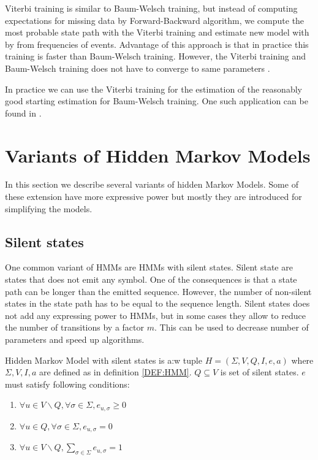 Viterbi training is similar to Baum-Welsch training, but instead of computing
expectations for missing data by Forward-Backward algorithm, we compute the most
probable state path with the Viterbi training and estimate new model with by
from frequencies of events. Advantage of this approach is that in practice this
training is faster than Baum-Welsch training. However, the Viterbi training and
Baum-Welsch training does not have to converge to same parameters
\cite{Durbin1998}.

In practice we can use the Viterbi training for the estimation of the reasonably
good starting estimation for Baum-Welsch training. One such application can be
found in \cite{FEAST2011}.

\section{Variants of Hidden Markov Models}

In this section we describe several variants of hidden Markov Models.
Some of these extension have more expressive power but mostly they are
introduced for simplifying the models.

\subsection{Silent states}

One common variant of HMMs are HMMs with silent states. Silent state are states
that does not emit any symbol. One of the consequences is  that a state path can
be longer than the emitted sequence. However, the number of non-silent states in
the state path has to be equal to the sequence length. Silent states does not
add any expressing power to HMMs, but in some cases they allow to reduce the
number of transitions by a factor $m$. This can be used to decrease number of
parameters and speed up algorithms. 

\begin{definition}
Hidden Markov Model with silent states is a:w
tuple $H=(\Sigma,V,Q,I,e,a)$
where $\Sigma,V,I,a$ are defined as in definition \ref{DEF:HMM}. $Q\subseteq V$ is set of
silent states. $e$ must satisfy following conditions:
\begin{enumerate}
\item $\forall u\in V\backslash Q,\forall \sigma\in\Sigma, e_{u,\sigma}\geq0$
\item $\forall u\in Q,\forall \sigma\in\Sigma, e_{u,\sigma}=0$
\item $\forall u\in V\backslash Q, \sum_{\sigma\in \Sigma}e_{u,\sigma}=1$
\end{enumerate}
\end{definition}


